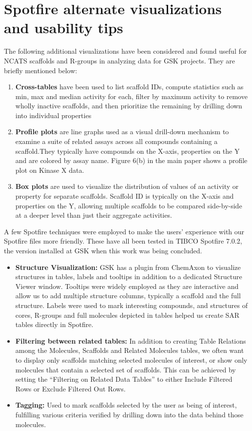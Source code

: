 \documentclass[11pt,letterpaper,biochem]{article}
\begin{document}
\newpage

\section{Spotfire alternate visualizations and usability tips}
\label{sec:spotviz-trick}
The following additional visualizations have been considered and found useful for NCATS scaffolds and R-groups in analyzing data for GSK projects. They are briefly mentioned below:
\begin{enumerate}
\item {\bf Cross-tables} have been used to list scaffold IDs, compute statistics such as min, max and median activity for each, filter by maximum activity to remove wholly inactive scaffolds, and then prioritize the remaining by drilling down into individual properties
\item {\bf Profile plots} are line graphs used as a visual drill-down mechanism to examine a suite of related assays across all compounds containing a scaffold.They typically have compounds on the X-axis, properties on the Y and are colored by assay name. Figure 6(b) in the main paper shows a profile plot on Kinase X data.
\item {\bf Box plots} are used to visualize the distribution of values of an activity or property for separate scaffolds. Scaffold ID is typically on the X-axis and properties on the Y, allowing multiple scaffolds to be compared side-by-side at a deeper level than just their aggregate activities. 
\end{enumerate}

A few Spotfire techniques were employed to make the users' experience with our Spotfire files more friendly. These have all been tested in TIBCO Spotfire 7.0.2, the version installed at GSK when this work was being concluded.
\begin{itemize}
\item {\bf Structure Visualization:} GSK has a plugin from ChemAxon to visualize structures in tables, labels and tooltips in addition to a dedicated Structure Viewer window. Tooltips were widely employed as they are interactive and allow us to add multiple structure columns, typically a scaffold and the full structure. Labels were used to mark interesting compounds, and structures of cores, R-groups and full molecules depicted in tables helped us create SAR tables directly in Spotfire.
\item {\bf Filtering between related tables:} In addition to creating Table Relations among the Molecules, Scaffolds and Related Molecules tables, we often want to display only scaffolds matching selected molecules of interest, or show only molecules that contain a selected set of scaffolds. This can be achieved by setting the ``Filtering on Related Data Tables'' to either Include Filtered Rows or Exclude Filtered Out Rows.
\item {\bf Tagging:} Used to mark scaffolds selected by the user as being of interest, fulfilling various criteria verified by drilling down into the data behind those molecules.    
\end{itemize}
\end{document}
